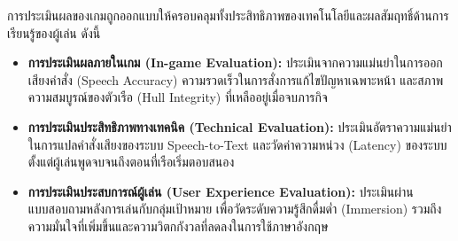 การประเมินผลของเกมถูกออกแบบให้ครอบคลุมทั้งประสิทธิภาพของเทคโนโลยีและผลสัมฤทธิ์ด้านการเรียนรู้ของผู้เล่น ดังนี้

\begin{itemize}
    \item \textbf{การประเมินผลภายในเกม (In-game Evaluation):} ประเมินจากความแม่นยำในการออกเสียงคำสั่ง (Speech Accuracy) ความรวดเร็วในการสั่งการแก้ไขปัญหาเฉพาะหน้า และสภาพความสมบูรณ์ของตัวเรือ (Hull Integrity) ที่เหลืออยู่เมื่อจบภารกิจ
    \item \textbf{การประเมินประสิทธิภาพทางเทคนิค (Technical Evaluation):} ประเมินอัตราความแม่นยำในการแปลคำสั่งเสียงของระบบ Speech-to-Text และวัดค่าความหน่วง (Latency) ของระบบตั้งแต่ผู้เล่นพูดจบจนถึงตอนที่เรือเริ่มตอบสนอง
    \item \textbf{การประเมินประสบการณ์ผู้เล่น (User Experience Evaluation):} ประเมินผ่านแบบสอบถามหลังการเล่นกับกลุ่มเป้าหมาย เพื่อวัดระดับความรู้สึกดื่มด่ำ (Immersion) รวมถึงความมั่นใจที่เพิ่มขึ้นและความวิตกกังวลที่ลดลงในการใช้ภาษาอังกฤษ
\end{itemize}